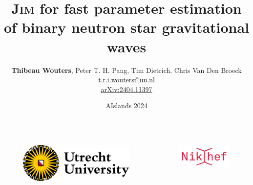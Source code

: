 \documentclass[usenames,dvipsnames,t]{beamer}
\title[arXiv:2404.11397] %
{\textsc{Jim} for fast parameter estimation of binary neutron star gravitational waves}
\author[Thibeau Wouters]{\small{\textbf{Thibeau Wouters}, Peter T. H. Pang, Tim Dietrich, Chris Van Den Broeck} \\ \vspace{2mm} \href{mailto:t.r.i.wouters@uu.nl}{t.r.i.wouters@uu.nl} \newline \github \quad \linkedin \quad \twitter \\ \vspace{7mm} \href{http://arxiv.org/abs/2404.11397}{arXiv:2404.11397}}
\date{AIslands 2024}
\begin{document}
{


\begin{frame}[plain]
\titlepage

\begin{columns}
  \begin{figure}
    \centering
    \vspace{1.5mm}
    \includegraphics[width=0.75\linewidth]{Figures/utrecht-university.png}
  \end{figure}
  \begin{figure}
    \centering
    \includegraphics[width=0.75\linewidth]{Figures/Nikhef_logo-transparent.png}
  \end{figure}
\end{columns}



\end{frame}
}
\end{document}
